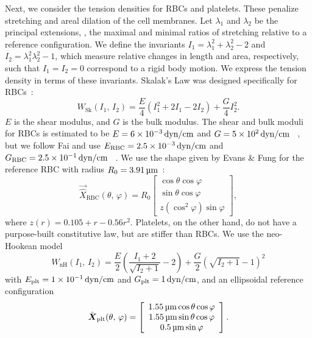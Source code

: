 Next, we consider the tension densities for RBCs and platelets. These penalize stretching
and areal dilation of the cell membranes. Let $\lambda_1$ and $\lambda_2$ be the
principal extensions, , the maximal and minimal ratios of stretching relative
to a reference configuration. We define the invariants $I_1=\lambda_1^2+\lambda_2^2-2$
and $I_2 = \lambda_1^2\lambda_2^2-1$, which measure relative changes in length and area,
respectively, such that $I_1 = I_2 = 0$ correspond to a rigid body motion. We express the
tension density in terms of these invariants. Skalak's Law was designed specifically for
RBCs~\cite{Skalak:1973tp}:
\begin{equation}\label{eq:skalak-law}
    W_\text{Sk}(I_1,\,I_2) = \frac{E}4\left(I_1^2 + 2I_1 - 2I_2\right) + \frac{G}4 I_2^2.
\end{equation}
$E$ is the shear modulus, and $G$ is the bulk modulus. The shear and bulk moduli for RBCs
is estimated to be $E = 6\times 10^{-3}\dynpercm$ and $G = 5\times 10^2 \dynpercm$~%
\cite{Mohandas:1994tg}, but we follow Fai  and use
$\rbc{E} = 2.5\times 10^{-3}\dynpercm$ and $\rbc{G} = 2.5\times 10^{-1}\dynpercm$~%
\cite{Fai:2013do}. We use the shape given by Evans \& Fung for the reference RBC with
radius $R_0 = 3.91\um$~\cite{Evans:1972uf}:
\begin{equation*}
    \vec{\hat{X}}_\text{RBC}(\theta,\,\varphi) = R_0\left[\begin{array}{c}
            \cos\theta\cos\varphi \\
            \sin\theta\cos\varphi \\
            z(\cos^2\varphi)\sin\varphi
    \end{array}\right],
\end{equation*}
where $z(r) = 0.105 + r - 0.56r^2$. Platelets, on the other hand, do not have a
purpose-built constitutive law, but are stiffer than RBCs. We use the neo-Hookean model
\begin{equation}\label{eq:neohookean}
    W_\text{nH}(I_1,\,I_2) = \frac{E}2\left(\frac{I_1+2}{\sqrt{I_2+1}}-2\right) + \frac{G}2 \left(\sqrt{I_2+1}-1\right)^2
\end{equation}
with $\plt{E} = 1\times 10^{-1}\dynpercm$ and $\plt{G} = 1\dynpercm$, and an ellipsoidal
reference configuration~\cite{Frojmovic:1982wk}
\begin{equation*}
    \plt{\hat{\vec{X}}}(\theta,\,\varphi) = \left[\begin{array}{c}
            1.55\um\cos\theta\cos\varphi \\
            1.55\um\sin\theta\cos\varphi \\
            0.5\um\sin\varphi
    \end{array}\right].
\end{equation*}

